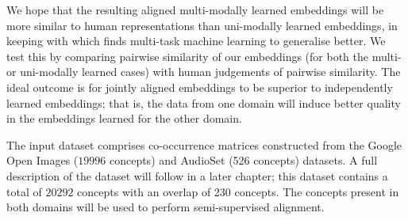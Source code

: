 We hope that the resulting aligned multi-modally learned embeddings will be more similar to human representations than uni-modally learned embeddings, in keeping with \cite{OverviewMultiTaskLearning} which finds multi-task machine learning to generalise better. We test this by comparing pairwise similarity of our embeddings (for both the multi- or uni-modally learned cases) with human judgements of pairwise similarity. The ideal outcome is for jointly aligned embeddings to be superior to independently learned embeddings; that is, the data from one domain will induce better quality in the embeddings learned for the other domain. 

The input dataset comprises co-occurrence matrices constructed from the Google Open Images ($19996$ concepts) \cite{openimages} and AudioSet (526 concepts) \cite{audioset} datasets. A full description of the dataset will follow in a later chapter; this dataset contains a total of $20292$ concepts with an overlap of 230 concepts. The concepts present in both domains will be used to perform semi-supervised alignment. 














